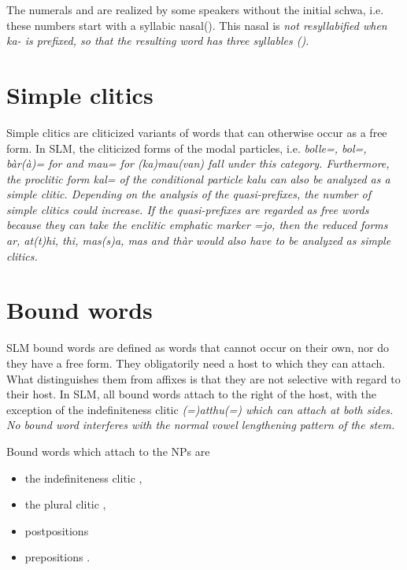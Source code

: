 The numerals  and  are realized by some speakers without the initial schwa, i.e. these numbers start with a syllabic nasal(). This nasal  is \em not \em resyllabified when \em ka- \em is prefixed, so that the resulting word has three syllables ().

 




\section{Simple clitics}\label{sec:morph:Simpleclitics}
Simple clitics are cliticized variants of words that can otherwise occur as a free form. In SLM, the cliticized forms of the modal particles, i.e. \em bolle=, bol=, bàr(à)= \em for  and \em mau= \em for \em (ka)mau(van) \em fall under this category. Furthermore, the proclitic form \em kal= \em of the conditional particle \em kalu \em can also be analyzed as a simple clitic. Depending on the analysis of the quasi-prefixes, the number of simple clitics could increase. If the quasi-prefixes are regarded as free words because they can take the enclitic emphatic marker \em =jo\em, then  the reduced forms \em ar, at(t)hi, thi, mas(s)a, mas \em and \em thàr \em would also have to be analyzed as simple clitics.

\section{Bound words}\label{sec:morph:Boundwords}
SLM bound words are defined as words that cannot occur on their own, nor do they have a free form. They obligatorily need a host to which they can attach. What distinguishes them from affixes is that they are not selective with regard to their host. In SLM, all bound words attach to the right of the host, with the exception of the indefiniteness clitic \em (=)atthu(=) \em which can attach at both sides. No bound word interferes with the normal vowel lengthening pattern of the stem.

Bound words which attach to the NPs are
\begin{itemize}
 \item the indefiniteness clitic ,
 \item the plural clitic ,
 \item   postpositions 
 \item  prepositions .
\end{itemize}





